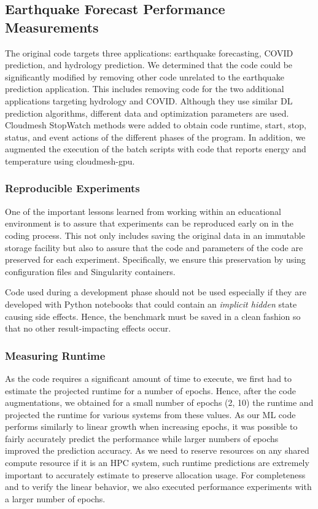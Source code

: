 \documentclass[utf8]{FrontiersinVancouver} %
\begin{document}
\subsection{Earthquake Forecast Performance Measurements}
\label{sec:perf-main}

The original code targets three applications: earthquake forecasting, COVID prediction, and hydrology prediction. We determined that the code could be significantly modified by removing other code unrelated to the earthquake prediction application. This includes removing code for the two additional applications targeting hydrology and COVID. Although they use similar DL prediction algorithms, different data and optimization parameters are used. Cloudmesh StopWatch methods were added to obtain code runtime, start, stop, status, and event actions of the different phases of the program. In addition, we augmented the execution of the batch scripts with code that reports energy and temperature using cloudmesh-gpu.


\subsubsection{Reproducible Experiments}

One of the important lessons learned from working within an educational environment is to assure that experiments can be reproduced early on in the coding process. This not only includes saving the original data in an immutable storage facility but also to assure that the code and parameters of the code are preserved for each experiment. Specifically, we ensure this preservation by using configuration files and Singularity containers. 

Code used during a development phase should not be used especially if they are developed with Python notebooks that could contain an {\em implicit
  hidden} state causing side effects. Hence, the benchmark 
must be saved in a clean fashion so that no other result-impacting
effects occur.

\subsubsection{Measuring Runtime}
\label{sec:perf-runtime}

As the code requires a significant amount of time to execute, we first had to estimate the projected runtime for a number of epochs. Hence, after the code augmentations, we obtained for a small number of epochs (2, 10) the runtime and projected the runtime for various systems from these values.  As our ML code performs similarly to linear growth when increasing epochs, it was possible to fairly accurately predict the performance while larger numbers of epochs improved the prediction accuracy. As we need to reserve resources on any shared compute resource if it is an HPC system, such runtime predictions are extremely important to accurately estimate to preserve allocation usage. For completeness and to verify the linear behavior, we also executed performance experiments with a larger number of epochs.
\end{document}
